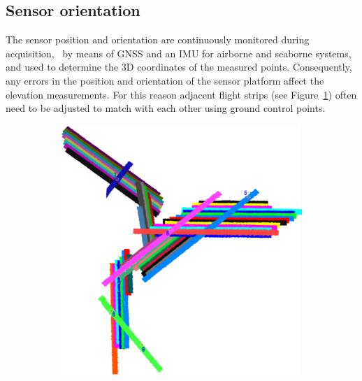 \subsection{Sensor orientation}
The sensor position and orientation are continuously monitored during acquisition, \eg\  by means of GNSS and an IMU for airborne and seaborne systems, and used to determine the 3D coordinates of the measured points. 
Consequently, any errors in the position and orientation of the sensor platform affect the elevation measurements. 
For this reason adjacent flight strips (see Figure~\ref{fig:lidarStrips}) often need to be adjusted to match with each other using ground control points. 
\begin{figure}
	\centering
	\begin{subfigure}{0.4\linewidth}
		\includegraphics[width=\textwidth]{figs/lidar_strips.png}
		\label{fig:lidarStrips}
	\end{subfigure}
	\quad
	\begin{subfigure}{0.4\linewidth}

\end{subfigure}
\end{figure}
